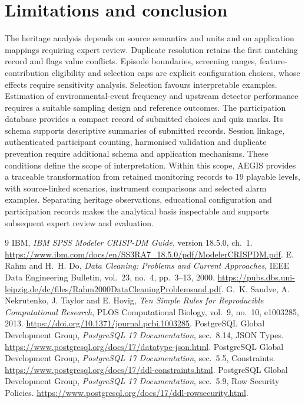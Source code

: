 \documentclass[10pt,a4paper]{article}
\begin{document}
\section{Limitations and conclusion}
The heritage analysis depends on source semantics and units and on application mappings requiring expert review. Duplicate resolution retains the first matching record and flags value conflicts. Episode boundaries, screening ranges, feature-contribution eligibility and selection caps are explicit configuration choices, whose effects require sensitivity analysis. Selection favours interpretable examples. Estimation of environmental-event frequency and upstream detector performance requires a suitable sampling design and reference outcomes. The participation database provides a compact record of submitted choices and quiz marks. Its schema supports descriptive summaries of submitted records. Session linkage, authenticated participant counting, harmonised validation and duplicate prevention require additional schema and application mechanisms. These conditions define the scope of interpretation. Within this scope, AEGIS provides a traceable transformation from retained monitoring records to 19 playable levels, with source-linked scenarios, instrument comparisons and selected alarm examples. Separating heritage observations, educational configuration and participation records makes the analytical basis inspectable and supports subsequent expert review and evaluation.

\clearpage
\begin{thebibliography}{9}
\small
{} IBM, \emph{IBM SPSS Modeler CRISP-DM Guide}, version 18.5.0, ch.~1. \url{https://www.ibm.com/docs/en/SS3RA7_18.5.0/pdf/ModelerCRISPDM.pdf}.
 E. Rahm and H.~H. Do, \emph{Data Cleaning: Problems and Current Approaches}, IEEE Data Engineering Bulletin, vol.~23, no.~4, pp.~3--13, 2000. \url{https://pubs.dbs.uni-leipzig.de/dc/files/Rahm2000DataCleaningProblemsand.pdf}.
 G.~K. Sandve, A. Nekrutenko, J. Taylor and E. Hovig, \emph{Ten Simple Rules for Reproducible Computational Research}, PLOS Computational Biology, vol.~9, no.~10, e1003285, 2013. \url{https://doi.org/10.1371/journal.pcbi.1003285}.
 PostgreSQL Global Development Group, \emph{PostgreSQL 17 Documentation}, sec.~8.14, JSON Types. \url{https://www.postgresql.org/docs/17/datatype-json.html}.
 PostgreSQL Global Development Group, \emph{PostgreSQL 17 Documentation}, sec.~5.5, Constraints. \url{https://www.postgresql.org/docs/17/ddl-constraints.html}.
 PostgreSQL Global Development Group, \emph{PostgreSQL 17 Documentation}, sec.~5.9, Row Security Policies. \url{https://www.postgresql.org/docs/17/ddl-rowsecurity.html}.
\end{thebibliography}
\clearpage\appendix
\end{document}
